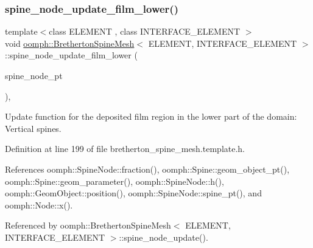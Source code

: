 \subsubsection{\texorpdfstring{spine\+\_\+node\+\_\+update\+\_\+film\+\_\+lower()}{spine\_node\_update\_film\_lower()}}
{\footnotesize\ttfamily template$<$class E\+L\+E\+M\+E\+NT , class I\+N\+T\+E\+R\+F\+A\+C\+E\+\_\+\+E\+L\+E\+M\+E\+NT $>$ \\
void \hyperlink{classoomph_1_1BrethertonSpineMesh}{oomph\+::\+Bretherton\+Spine\+Mesh}$<$ E\+L\+E\+M\+E\+NT, I\+N\+T\+E\+R\+F\+A\+C\+E\+\_\+\+E\+L\+E\+M\+E\+NT $>$\+::spine\+\_\+node\+\_\+update\+\_\+film\+\_\+lower (\begin{DoxyParamCaption}\item[{\hyperlink{classoomph_1_1SpineNode}{Spine\+Node} $\ast$}]{spine\+\_\+node\+\_\+pt }\end{DoxyParamCaption})\hspace{0.3cm}{\ttfamily [inline]}, {\ttfamily [protected]}}



Update function for the deposited film region in the lower part of the domain\+: Vertical spines. 



Definition at line 199 of file bretherton\+\_\+spine\+\_\+mesh.\+template.\+h.



References oomph\+::\+Spine\+Node\+::fraction(), oomph\+::\+Spine\+::geom\+\_\+object\+\_\+pt(), oomph\+::\+Spine\+::geom\+\_\+parameter(), oomph\+::\+Spine\+Node\+::h(), oomph\+::\+Geom\+Object\+::position(), oomph\+::\+Spine\+Node\+::spine\+\_\+pt(), and oomph\+::\+Node\+::x().



Referenced by oomph\+::\+Bretherton\+Spine\+Mesh$<$ E\+L\+E\+M\+E\+N\+T, I\+N\+T\+E\+R\+F\+A\+C\+E\+\_\+\+E\+L\+E\+M\+E\+N\+T $>$\+::spine\+\_\+node\+\_\+update().

\mbox{\label{classoomph_1_1BrethertonSpineMesh_a3919bd086252db283ee5242b4688f8d1}} 
